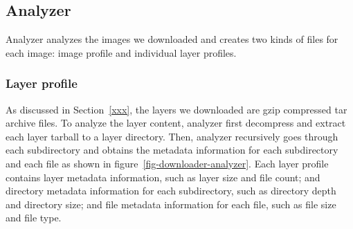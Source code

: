 %
%

\subsection{Analyzer}

Analyzer analyzes the images we downloaded and creates two kinds of files for each image: image profile and individual layer profiles.
%
%
\subsubsection{Layer profile}

As discussed in Section~\ref{xxx}, the layers we downloaded are gzip compressed tar archive files.
%
To analyze the layer content, analyzer first decompress and extract each layer tarball to a layer directory.
%
Then, analyzer recursively goes through each subdirectory and obtains the metadata information for each subdirectory and each file as shown in figure~\ref{fig-downloader-analyzer}. Each layer profile contains layer metadata information, such as layer size and file count; and directory metadata information for each subdirectory, such as directory depth and directory size; and file metadata information for each file, such as file size and file type.
%






